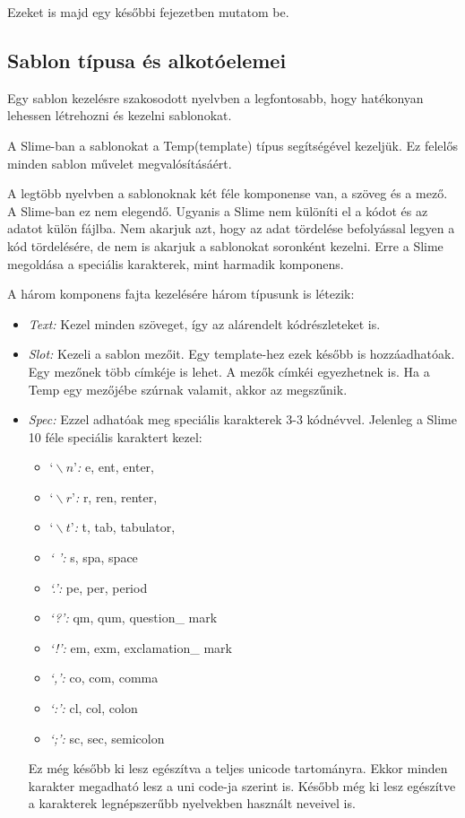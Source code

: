 Ezeket is majd egy későbbi fejezetben mutatom be.

\subsection{Sablon típusa és alkotóelemei}
Egy sablon kezelésre szakosodott nyelvben a legfontosabb, hogy hatékonyan lehessen létrehozni és kezelni sablonokat.

A Slime-ban a sablonokat a Temp(template) típus segítségével kezeljük. Ez felelős minden sablon művelet megvalósításáért.

A legtöbb nyelvben a sablonoknak két féle komponense van, a szöveg és a mező. 
A Slime-ban ez nem elegendő.
Ugyanis a Slime nem különíti el a kódot és az adatot külön fájlba.
Nem akarjuk azt, hogy az adat tördelése befolyással legyen a kód tördelésére, de nem is akarjuk a sablonokat soronként kezelni.
Erre a Slime megoldása a speciális karakterek, mint harmadik komponens.

A három komponens fajta kezelésére három típusunk is létezik:
\begin{itemize}
\item \emph{Text:} 
Kezel minden szöveget, így az alárendelt kódrészleteket is.
\item \emph{Slot:} 
Kezeli a sablon mezőit.
Egy template-hez ezek később is hozzáadhatóak.
Egy mezőnek több címkéje is lehet.
A mezők címkéi egyezhetnek is.
Ha a Temp egy mezőjébe szúrnak valamit, akkor az megszűnik.
\item \emph{Spec:} 
Ezzel adhatóak meg speciális karakterek 3-3 kódnévvel.
Jelenleg a Slime 10 féle speciális karaktert kezel:
\begin{itemize}
\item \emph{$‘\backslash n’$:} e, ent, enter, 
\item \emph{$‘\backslash r’$:} r, ren, renter, 
\item \emph{$‘\backslash t’$:} t, tab, tabulator, 
\item \emph{‘ ’:} s, spa, space 
\item \emph{‘.’:} pe, per, period 
\item \emph{‘?’:} qm, qum, question\_ mark 
\item \emph{‘!’:} em, exm, exclamation\_ mark 
\item \emph{‘,’:} co, com, comma
\item \emph{‘:’:} cl, col, colon 
\item \emph{‘;’:} sc, sec, semicolon
\end{itemize}
Ez még később ki lesz egészítva a teljes unicode tartományra. Ekkor minden karakter megadható lesz a uni code-ja szerint is.
Később még ki lesz egészítve a karakterek legnépszerűbb nyelvekben használt neveivel is.
\end{itemize}

